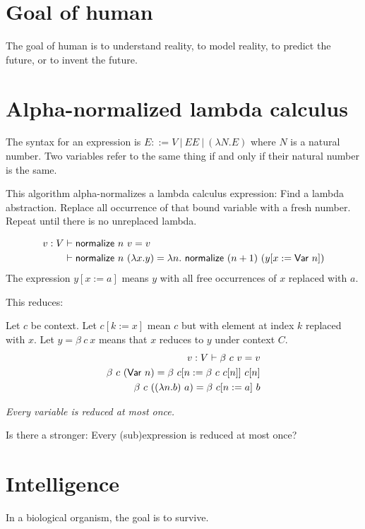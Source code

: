 \section{Goal of human}

The goal of human is to understand reality, to model reality, to predict the future, or to invent the future.

\section{Alpha-normalized lambda calculus}

The syntax for an expression is \(E ::= V ~|~ EE ~|~ (\lambda N . E) \)
where \(N\) is a natural number.
Two variables refer to the same thing if and only if their natural number is the same.

This algorithm alpha-normalizes a lambda calculus expression:
Find a lambda abstraction.
Replace all occurrence of that bound variable with a fresh number.
Repeat until there is no unreplaced lambda.

\begin{align*}
    v : V &\vdash \textsf{normalize}~n~v = v
    \\
    &\vdash \textsf{normalize}~n~(\lambda x.y) = \lambda n. ~ \textsf{normalize}~(n+1)~(y[x := \textsf{Var}~n])
\end{align*}
The expression \(y[x := a]\) means \(y\)
with all free occurrences of \(x\) replaced with \(a\).

This reduces:

Let \(c\) be context.
Let \(c[k := x]\) mean \(c\) but with element at index \(k\) replaced with \(x\).
Let \(y = \beta~c~x\) means that \(x\) reduces to \(y\) under context \(C\).
\begin{align*}
    v : V \vdash \beta~c~v = v
    \\
    \beta~c~(\textsf{Var}~n) = \beta~c[n := \beta~c~c[n]]~c[n]
    \\
    \beta~c~((\lambda n. b)~a) = \beta~c[n := a]~b
\end{align*}

\emph{Every variable is reduced at most once.}

Is there a stronger: Every (sub)expression is reduced at most once?

\section{Intelligence}

In a biological organism, the goal is to survive.

